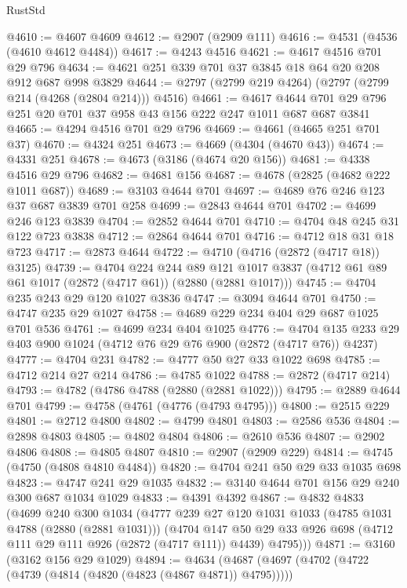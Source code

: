 \begin{lexlean}{RustStd}
\begin{coremodule}
{\begin{coremodule}
{{{{{{{{{{{{{{{{{{{{@4610 := @4607 @4609
@4612 := @2907 (@2909 @111)
@4616 := @4531 (@4536 (@4610 @4612 @4484))
@4617 := @4243 @4516
@4621 := @4617 @4516 @701 @29 @796
@4634 := @4621 @251 @339 @701 @37 @3845 @18 @64 @20 @208 @912 @687 @998 @3829
@4644 := @2797 (@2799 @219 @4264) (@2797 (@2799 @214 (@4268 (@2804 @214))) @4516)
@4661 := @4617 @4644 @701 @29 @796 @251 @20 @701 @37 @958 @43 @156 @222 @247 @1011 @687 @687 @3841
@4665 := @4294 @4516 @701 @29 @796
@4669 := @4661 (@4665 @251 @701 @37)
@4670 := @4324 @251
@4673 := @4669 (@4304 (@4670 @43))
@4674 := @4331 @251
@4678 := @4673 (@3186 (@4674 @20 @156))
@4681 := @4338 @4516 @29 @796
@4682 := @4681 @156
@4687 := @4678 (@2825 (@4682 @222 @1011 @687))
@4689 := @3103 @4644 @701
@4697 := @4689 @76 @246 @123 @37 @687 @3839 @701 @258
@4699 := @2843 @4644 @701
@4702 := @4699 @246 @123 @3839
@4704 := @2852 @4644 @701
@4710 := @4704 @48 @245 @31 @122 @723 @3838
@4712 := @2864 @4644 @701
@4716 := @4712 @18 @31 @18 @723
@4717 := @2873 @4644
@4722 := @4710 (@4716 (@2872 (@4717 @18)) @3125)
@4739 := @4704
    @224
    @244
    @89
    @121
    @1017
    @3837
    (@4712 @61 @89 @61 @1017 (@2872 (@4717 @61)) (@2880 (@2881 @1017)))
@4745 := @4704 @235 @243 @29 @120 @1027 @3836
@4747 := @3094 @4644 @701
@4750 := @4747 @235 @29 @1027
@4758 := @4689 @229 @234 @404 @29 @687 @1025 @701 @536
@4761 := @4699 @234 @404 @1025
@4776 := @4704 @135 @233 @29 @403 @900 @1024 (@4712 @76 @29 @76 @900 (@2872 (@4717 @76)) @4237)
@4777 := @4704 @231
@4782 := @4777 @50 @27 @33 @1022 @698
@4785 := @4712 @214 @27 @214
@4786 := @4785 @1022
@4788 := @2872 (@4717 @214)
@4793 := @4782 (@4786 @4788 (@2880 (@2881 @1022)))
@4795 := @2889 @4644 @701
@4799 := @4758 (@4761 (@4776 (@4793 @4795)))
@4800 := @2515 @229
@4801 := @2712 @4800
@4802 := @4799 @4801
@4803 := @2586 @536
@4804 := @2898 @4803
@4805 := @4802 @4804
@4806 := @2610 @536
@4807 := @2902 @4806
@4808 := @4805 @4807
@4810 := @2907 (@2909 @229)
@4814 := @4745 (@4750 (@4808 @4810 @4484))
@4820 := @4704 @241 @50 @29 @33 @1035 @698
@4823 := @4747 @241 @29 @1035
@4832 := @3140 @4644 @701 @156 @29 @240 @300 @687 @1034 @1029
@4833 := @4391 @4392
@4867 := @4832
    @4833
    (@4699
      @240
      @300
      @1034
      (@4777
        @239
        @27
        @120
        @1031
        @1033
        (@4785 @1031 @4788 (@2880 (@2881 @1031)))
        (@4704
          @147
          @50
          @29
          @33
          @926
          @698
          (@4712 @111 @29 @111 @926 (@2872 (@4717 @111)) @4439)
          @4795)))
@4871 := @3160 (@3162 @156 @29 @1029)
@4894 := @4634
    (@4687
      (@4697
        (@4702 (@4722 (@4739 (@4814 (@4820 (@4823 (@4867 @4871)) @4795)))))
}}}}}}}}}}}}}}}}}}}}
\end{coremodule}}
\end{coremodule}
\end{lexlean}

